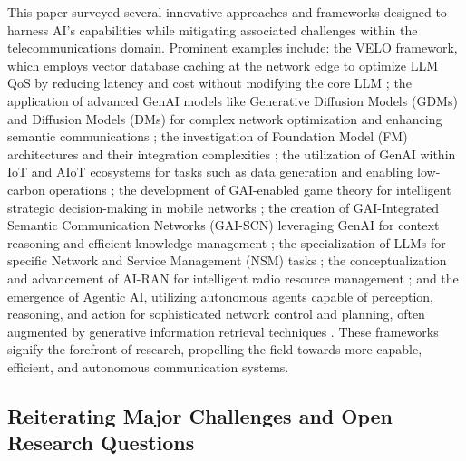\documentclass[sigconf]{acmart}
\begin{document}
This paper surveyed several innovative approaches and frameworks designed to harness AI's capabilities while mitigating associated challenges within the telecommunications domain. Prominent examples include: the VELO framework, which employs vector database caching at the network edge to optimize LLM QoS by reducing latency and cost without modifying the core LLM \cite{ref14}; the application of advanced GenAI models like Generative Diffusion Models (GDMs) and Diffusion Models (DMs) for complex network optimization and enhancing semantic communications \cite{ref15, ref19, ref33}; the investigation of Foundation Model (FM) architectures and their integration complexities \cite{ref21}; the utilization of GenAI within IoT and AIoT ecosystems for tasks such as data generation and enabling low-carbon operations \cite{ref22, ref29}; the development of GAI-enabled game theory for intelligent strategic decision-making in mobile networks \cite{ref23}; the creation of GAI-Integrated Semantic Communication Networks (GAI-SCN) leveraging GenAI for context reasoning and efficient knowledge management \cite{ref24, ref34}; the specialization of LLMs for specific Network and Service Management (NSM) tasks \cite{ref26}; the conceptualization and advancement of AI-RAN for intelligent radio resource management \cite{ref25}; and the emergence of Agentic AI, utilizing autonomous agents capable of perception, reasoning, and action for sophisticated network control and planning, often augmented by generative information retrieval techniques \cite{ref35}. These frameworks signify the forefront of research, propelling the field towards more capable, efficient, and autonomous communication systems.

\subsection{Reiterating Major Challenges and Open Research Questions}
\label{subsec:reiterating_challenges}
\end{document}
